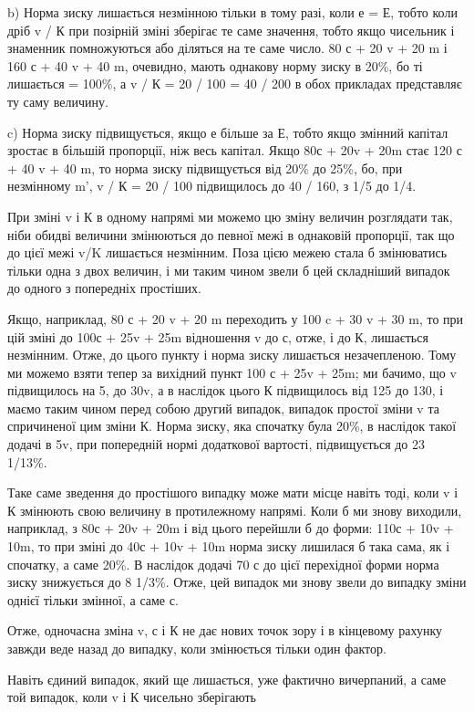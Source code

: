 b) Норма зиску лишається незмінною тільки в тому разі, коли
е = Е, тобто коли дріб v / К при позірній зміні зберігає те саме
значення, тобто якщо чисельник і знаменник помножуються або
діляться на те саме число. 80 с + 20 v + 20 m і 160 с + 40 v + 40 m,
очевидно, мають однакову норму зиску в 20\%, бо ті лишається
= 100\%, а v / К = 20 / 100 = 40 / 200 в обох прикладах представляє
ту саму величину.

c) Норма зиску підвищується, якщо е більше за Е, тобто
якщо змінний капітал зростає в більшій пропорції, ніж весь капітал.
Якщо 80с + 20v + 20m стає 120 с + 40 v + 40 m, то норма
зиску підвищується від 20\% до 25\%, бо, при незмінному m',
v / К = 20 / 100 підвищилось до 40 / 160, з 1/5 до 1/4.

При зміні v і К в одному напрямі ми можемо цю зміну величин
розглядати так, ніби обидві величини змінюються до певної
межі в однаковій пропорції, так що до цієї межі v/K лишається
незмінним. Поза цією межею стала б змінюватись тільки
одна з двох величин, і ми таким чином звели б цей складніший
випадок до одного з попередніх простіших.

Якщо, наприклад, 80 с + 20 v + 20 m переходить у 100 c +
30 v + 30 m, то при цій зміні до 100с + 25v + 25m відношення
v до с, отже, і до К, лишається незмінним. Отже, до цього
пункту і норма зиску лишається незачепленою. Тому ми можемо
взяти тепер за вихідний пункт 100 с + 25v + 25m; ми бачимо,
що v підвищилось на 5, до 30v, а в наслідок цього К підвищилось
від 125 до 130, і маємо таким чином перед собою другий
випадок, випадок простої зміни v та спричиненої цим
зміни К. Норма зиску, яка спочатку була 20\%, в наслідок такої
додачі в 5v, при попередній нормі додаткової вартості, підвищується
до 23 1/13\%.

Таке саме зведення до простішого випадку може мати місце
навіть тоді, коли v і К змінюють свою величину в протилежному
напрямі. Коли б ми знову виходили, наприклад, з 80с + 20v +
20m і від цього перейшли б до форми: 110с + 10v + 10m, то
при зміні до 40с + 10v + 10m норма зиску лишилася б така
сама, як і спочатку, а саме 20\%. В наслідок додачі 70 с до цієї
перехідної форми норма зиску знижується до 8 1/3\%. Отже, цей
випадок ми знову звели до випадку зміни однієї тільки змінної,
а саме с.

Отже, одночасна зміна v, с і К не дає нових точок зору і в
кінцевому рахунку завжди веде назад до випадку, коли змінюється
тільки один фактор.

Навіть єдиний випадок, який ще лишається, уже фактично
вичерпаний, а саме той випадок, коли v і К чисельно зберігають
